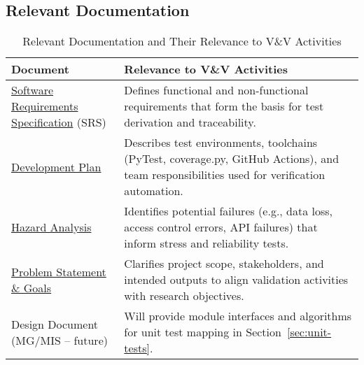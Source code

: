 \documentclass[12pt, titlepage]{article}
\renewcommand{\arraystretch}{1.15}
\begin{document}
\subsection{Relevant Documentation}
\label{subsec:relevant-docs}


\begin{table}[H]
\centering
\caption{Relevant Documentation and Their Relevance to V\&V Activities}
\setlength{\tabcolsep}{5pt}
\renewcommand{\arraystretch}{1.2}
\footnotesize

\begin{tabularx}{\textwidth}{l X}
\toprule
\textbf{Document} & \textbf{Relevance to V\&V Activities} \\
\midrule
\arrayrulecolor[gray]{0.8}
\href{https://github.com/thaafei/DomainX/blob/main/docs/SRS/SRS.pdf}{Software Requirements Specification} (SRS) &
Defines functional and non-functional requirements that form the basis for
test derivation and traceability. \\
\hline
\href{https://github.com/thaafei/DomainX/blob/main/docs/DevelopmentPlan/DevelopmentPlan.pdf}{Development Plan} &
Describes test environments, toolchains (PyTest, coverage.py, GitHub Actions),
and team responsibilities used for verification automation. \\
\hline
\href{https://github.com/thaafei/DomainX/blob/main/docs/HazardAnalysis/HazardAnalysis.pdf}{Hazard Analysis} &
Identifies potential failures (e.g., data loss, access control errors, API
failures) that inform stress and reliability tests. \\
\hline
\href{https://github.com/thaafei/DomainX/blob/main/docs/ProblemStatementAndGoals/ProblemStatement.pdf}{Problem Statement \& Goals} &
Clarifies project scope, stakeholders, and intended outputs to align validation
activities with research objectives. \\
\hline
Design Document (MG/MIS – future) &
Will provide module interfaces and algorithms for unit test mapping in
Section~\ref{sec:unit-tests}. \\
\bottomrule
\end{tabularx}
\end{table}
\end{document}

